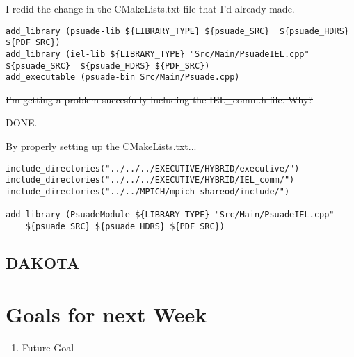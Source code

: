 I redid the change in the CMakeLists.txt file that I'd already made.

\begin{verbatim}
add_library (psuade-lib ${LIBRARY_TYPE} ${psuade_SRC}  ${psuade_HDRS} ${PDF_SRC})
add_library (iel-lib ${LIBRARY_TYPE} "Src/Main/PsuadeIEL.cpp" ${psuade_SRC}  ${psuade_HDRS} ${PDF_SRC})
add_executable (psuade-bin Src/Main/Psuade.cpp)
\end{verbatim}


\sout{I'm getting a problem succesfully including the IEL\_comm.h file. Why?}

DONE.

By properly setting up the CMakeLists.txt...
\begin{verbatim}
include_directories("../../../EXECUTIVE/HYBRID/executive/")
include_directories("../../../EXECUTIVE/HYBRID/IEL_comm/")
include_directories("../../MPICH/mpich-shareod/include/")

add_library (PsuadeModule ${LIBRARY_TYPE} "Src/Main/PsuadeIEL.cpp"
	${psuade_SRC} ${psuade_HDRS} ${PDF_SRC})
\end{verbatim}


\subsection{DAKOTA}

\section{Goals for next Week}
\begin{enumerate}
\item Future Goal
\end{enumerate}


